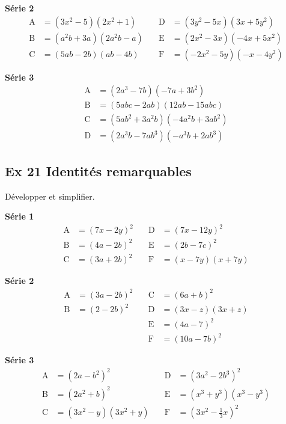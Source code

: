 \documentclass[a4paper,11pt]{article}
\begin{document}
\textbf{Série 2}
\[
\begin{aligned}
\mathrm{A}&=(3x^{2}-5)(2x^{2}+1) &\quad \mathrm{D}&=(3y^{2}-5x)(3x+5y^{2})\\
\mathrm{B}&=(a^{2}b+3a)(2a^{2}b-a) &\quad \mathrm{E}&=(2x^{2}-3x)(-4x+5x^{2})\\
\mathrm{C}&=(5ab-2b)(ab-4b) &\quad \mathrm{F}&=(-2x^{2}-5y)(-x-4y^{2})
\end{aligned}
\]

\textbf{Série 3}
\[
\begin{aligned}
\mathrm{A}&=(2a^{3}-7b)(-7a+3b^{2})\\
\mathrm{B}&=(5abc-2ab)(12ab-15abc)\\
\mathrm{C}&=(5ab^{2}+3a^{2}b)(-4a^{2}b+3ab^{2})\\
\mathrm{D}&=(2a^{3}b-7ab^{3})(-a^{3}b+2ab^{3})
\end{aligned}
\]


\subsection*{Ex 21 \; Identités remarquables}
Développer et simplifier.

\textbf{Série 1}
\[
\begin{aligned}
\mathrm{A}&=(7x-2y)^{2} &\quad \mathrm{D}&=(7x-12y)^{2}\\
\mathrm{B}&=(4a-2b)^{2} &\quad \mathrm{E}&=(2b-7c)^{2}\\
\mathrm{C}&=(3a+2b)^{2} &\quad \mathrm{F}&=(x-7y)(x+7y)
\end{aligned}
\]

\textbf{Série 2}
\[
\begin{aligned}
\mathrm{A}&=(3a-2b)^{2} &\quad \mathrm{C}&=(6a+b)^{2}\\
\mathrm{B}&=(2-2b)^{2} &\quad \mathrm{D}&=(3x-z)(3x+z)\\
& &\quad \mathrm{E}&=(4a-7)^{2}\\
& &\quad \mathrm{F}&=(10a-7b)^{2}
\end{aligned}
\]

\textbf{Série 3}
\[
\begin{aligned}
\mathrm{A}&=(2a-b^{2})^{2} &\quad \mathrm{D}&=(3a^{2}-2b^{3})^{2}\\
\mathrm{B}&=(2a^{2}+b)^{2} &\quad \mathrm{E}&=(x^{3}+y^{3})(x^{3}-y^{3})\\
\mathrm{C}&=(3x^{2}-y)(3x^{2}+y) &\quad \mathrm{F}&=\left(3x^{2}-\tfrac{1}{3}x\right)^{2}
\end{aligned}
\]
\end{document}
